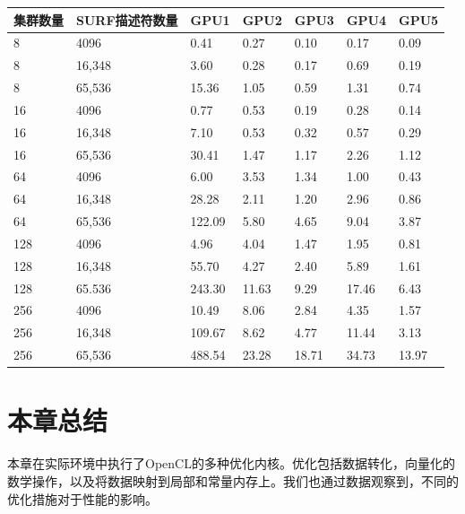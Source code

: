 \par\medskip\noindent
\begingroup\fontsize{9bp}{12.5bp}\selectfont\renewcommand{\arraystretch}{1.12}
\begin{center}
\begin{tabular}{lllllll}
\toprule
集群数量 & SURF描述符数量 & GPU1 & GPU2 & GPU3 & GPU4 & GPU5 \\
\midrule
8 & 4096 & 0.41 & 0.27 & 0.10 & 0.17 & 0.09 \\
8 & 16,348 & 3.60 & 0.28 & 0.17 & 0.69 & 0.19 \\
8 & 65,536 & 15.36 & 1.05 & 0.59 & 1.31 & 0.74 \\
16 & 4096 & 0.77 & 0.53 & 0.19 & 0.28 & 0.14 \\
16 & 16,348 & 7.10 & 0.53 & 0.32 & 0.57 & 0.29 \\
16 & 65,536 & 30.41 & 1.47 & 1.17 & 2.26 & 1.12 \\
64 & 4096 & 6.00 & 3.53 & 1.34 & 1.00 & 0.43 \\
64 & 16,348 & 28.28 & 2.11 & 1.20 & 2.96 & 0.86 \\
64 & 65,536 & 122.09 & 5.80 & 4.65 & 9.04 & 3.87 \\
128 & 4096 & 4.96 & 4.04 & 1.47 & 1.95 & 0.81 \\
128 & 16,348 & 55.70 & 4.27 & 2.40 & 5.89 & 1.61 \\
128 & 65.536 & 243.30 & 11.63 & 9.29 & 17.46 & 6.43 \\
256 & 4096 & 10.49 & 8.06 & 2.84 & 4.35 & 1.57 \\
256 & 16,348 & 109.67 & 8.62 & 4.77 & 11.44 & 3.13 \\
256 & 65,536 & 488.54 & 23.28 & 18.71 & 34.73 & 13.97 \\
\bottomrule
\end{tabular}
\end{center}
\endgroup
\medskip



\section{本章总结}

本章在实际环境中执行了OpenCL的多种优化内核。优化包括数据转化，向量化的数学操作，以及将数据映射到局部和常量内存上。我们也通过数据观察到，不同的优化措施对于性能的影响。



